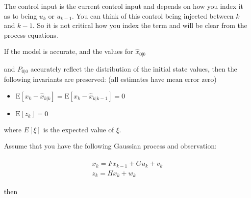 The control input is the current control input and depends on how you
index it as to being \(u_k\) or \(u_{k-1}\). You can think of this
control being injected between \(k\) and \(k-1\). So it is not critical
how you index the term and will be clear from the process equations.

If the model is accurate, and the values for \(\hat{x}_{0|0}\)

and \(P_{0|0}\) accurately reflect the distribution of the initial state
values, then the following invariants are preserved: (all estimates have
mean error zero)

\begin{itemize}
\tightlist
\item
  \(\textrm{E}[x_k - \hat{x}_{k|k}] =\textrm{E}[x_k - \hat{x}_{k|k-1}] = 0\)
\item
  \(\textrm{E}[z_k] = 0\)
\end{itemize}

where \(E[\xi]\) is the expected value of \(\xi\).

Assume that you have the following Gaussian process and observation:

\[\begin{aligned}
\begin{array}{l}
x_k = Fx_{k-1} + Gu_k + v_k\\
z_k = Hx_k + w_k
\end{array}
\end{aligned}\]

then

